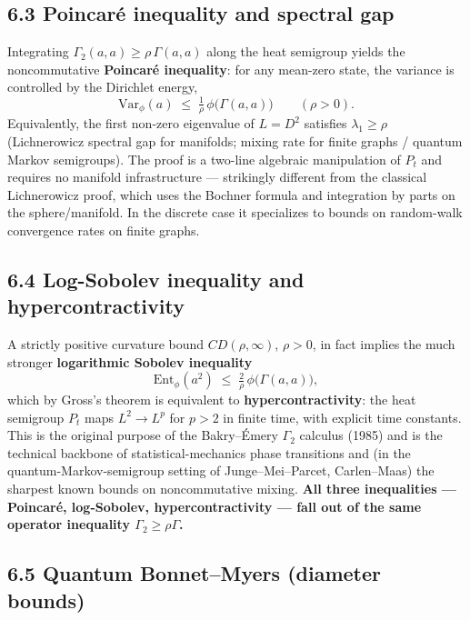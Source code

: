 \documentclass[
  11pt,
]{article}
\begin{document}
\subsection{6.3 Poincaré inequality and spectral
gap}\label{poincaruxe9-inequality-and-spectral-gap}

Integrating \(\Gamma_2(a, a) \geq \rho\,\Gamma(a, a)\) along the heat
semigroup yields the noncommutative \textbf{Poincaré inequality}: for
any mean-zero state, the variance is controlled by the Dirichlet energy,
\[
\mathrm{Var}_\phi(a) \;\leq\; \tfrac{1}{\rho}\,\phi\bigl(\Gamma(a, a)\bigr) \qquad (\rho > 0).
\] Equivalently, the first non-zero eigenvalue of \(L = D^2\) satisfies
\(\lambda_1 \geq \rho\) (Lichnerowicz spectral gap for manifolds; mixing
rate for finite graphs / quantum Markov semigroups). The proof is a
two-line algebraic manipulation of \(P_t\) and requires no manifold
infrastructure --- strikingly different from the classical Lichnerowicz
proof, which uses the Bochner formula and integration by parts on the
sphere/manifold. In the discrete case it specializes to bounds on
random-walk convergence rates on finite graphs.

\subsection{6.4 Log-Sobolev inequality and
hypercontractivity}\label{log-sobolev-inequality-and-hypercontractivity}

A strictly positive curvature bound \(CD(\rho, \infty)\), \(\rho > 0\),
in fact implies the much stronger \textbf{logarithmic Sobolev
inequality} \[
\mathrm{Ent}_\phi(a^2) \;\leq\; \tfrac{2}{\rho}\,\phi\bigl(\Gamma(a, a)\bigr),
\] which by Gross's theorem is equivalent to
\textbf{hypercontractivity}: the heat semigroup \(P_t\) maps
\(L^2 \to L^p\) for \(p > 2\) in finite time, with explicit time
constants. This is the original purpose of the Bakry--Émery \(\Gamma_2\)
calculus (1985) and is the technical backbone of statistical-mechanics
phase transitions and (in the quantum-Markov-semigroup setting of
Junge--Mei--Parcet, Carlen--Maas) the sharpest known bounds on
noncommutative mixing. \textbf{All three inequalities --- Poincaré,
log-Sobolev, hypercontractivity --- fall out of the same operator
inequality \(\Gamma_2 \geq \rho \Gamma\).}

\subsection{6.5 Quantum Bonnet--Myers (diameter
bounds)}\label{quantum-bonnetmyers-diameter-bounds}
\end{document}
